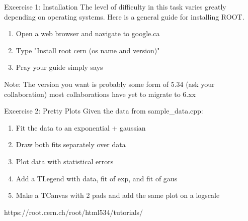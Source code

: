 \documentclass[xcolor=svgnames]{beamer}
\newcommand{\backupbegin}{
   \newcounter{framenumbervorappendix}
   \setcounter{framenumbervorappendix}{\value{framenumber}}
}
\newcommand{\backupend}{
   \addtocounter{framenumbervorappendix}{-\value{framenumber}}
   \addtocounter{framenumber}{\value{framenumbervorappendix}} 
}
\begin{document}
\begin{frame}{Excercise 1: Installation}
  The level of difficulty in this task varies greatly depending on operating systems. Here
  is a general guide for installing ROOT.
  \begin{enumerate}
  \item Open a web browser and navigate to google.ca
  \item Type "Install root cern (os name and version)"
  \item Pray your guide simply says
  \end{enumerate}
  Note: The version you want is probably some form of 5.34 (ask your collaboration)
  most collaborations have yet to migrate to 6.xx
\end{frame}

\begin{frame}{Excercise 2: Pretty Plots}
  Given the data from sample\_data.cpp:
  \begin{enumerate}
  \item Fit the data to an exponential + gaussian
  \item Draw both fits separately over data
  \item Plot data with statistical errors
  \item Add a TLegend with data, fit of exp, and fit of gaus
  \item Make a TCanvas with 2 pads and add the same plot on a logscale
  \end{enumerate}
  https://root.cern.ch/root/html534/tutorials/
\end{frame}

\end{document}
